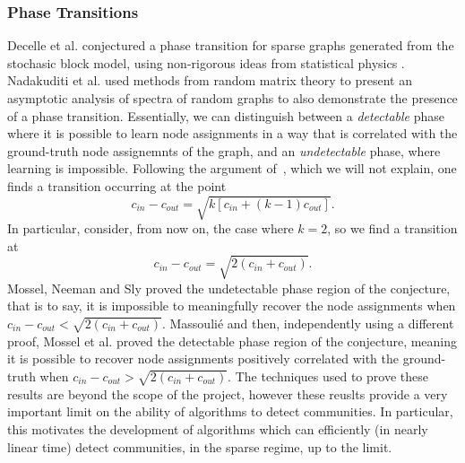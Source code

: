 \documentclass[12pt]{article}
\numberwithin{equation}{section}
\begin{document}

\subsubsection{Phase Transitions}
\label{sec:background;subsec:communityDetection;subsubsec:phaseTransitions}

Decelle et al. \cite{DKM+11} conjectured a phase transition for sparse graphs generated from the stochasic block model, using non-rigorous ideas from statistical physics \cite{MNS12}. Nadakuditi et al. \cite{NN12} used methods from random matrix theory to present an asymptotic analysis of spectra of random graphs to also demonstrate the presence of a phase transition. Essentially, we can distinguish between a \textsl{detectable} phase where it is possible to learn node assignments in a way that is correlated with the ground-truth node assignemnts of the graph, and an \textsl{undetectable} phase, where learning is impossible. Following the argument of~\cite{NN12}, which we will not explain, one finds a transition occurring at the point
\begin{equation}
\label{eq:phaseTransitionK}
	c_{in} - c_{out} = \sqrt{k[c_{in} + (k-1)c_{out}]}.
\end{equation}
In particular, consider, from now on, the case where $k = 2$, so we find a transition at
\begin{equation}
\label{eq:phaseTransitionK}
	c_{in} - c_{out} = \sqrt{2(c_{in} + c_{out})}.
\end{equation}
Mossel, Neeman and Sly \cite{MNS12} proved the undetectable phase region of the conjecture, that is to say, it is impossible to meaningfully recover the node assignments when $ c_{in} - c_{out} < \sqrt{2(c_{in} + c_{out})}$. Massouli\'e \cite{Mas13} and then, independently using a different proof, Mossel et al. \cite{MNS13b} proved the detectable phase region of the conjecture, meaning it is possible to recover node assignments positively correlated with the ground-truth when $ c_{in} - c_{out} > \sqrt{2(c_{in} + c_{out})}$. The techniques used to prove these results are beyond the scope of the project, however these reuslts provide a very important limit on the ability of algorithms to detect communities. In particular, this motivates the development of algorithms which can efficiently (in nearly linear time) detect communities, in the sparse regime, up to the limit.
\end{document}
